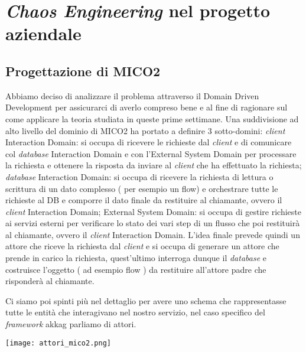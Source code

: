 
\chapter{\textit{Chaos Engineering} nel progetto aziendale}
\label{cap:analisi-requisiti}


\section{Progettazione di MICO2}

Abbiamo deciso di analizzare il problema attraverso il Domain Driven Development per assicurarci di averlo compreso bene e al fine di ragionare sul come applicare la teoria studiata in queste prime settimane. 
Una suddivisione ad alto livello del dominio di MICO2 ha portato a definire 3 sotto-domini: \textit{client} Interaction Domain: si occupa di ricevere le richieste dal \textit{client} e di comunicare col \textit{database} Interaction Domain e con l’External System Domain per processare la richiesta e ottenere la risposta da inviare al \textit{client} che ha effettuato la richiesta; 
\textit{database} Interaction Domain: si occupa di ricevere la richiesta di lettura o scrittura di un dato complesso ( per esempio un flow) e orchestrare tutte le richieste al DB e comporre il dato finale da restituire al chiamante, ovvero il \textit{client} Interaction Domain; 
External System Domain: si occupa di gestire richieste ai servizi esterni per verificare lo stato dei vari step di un flusso che poi restituirà al chiamante, ovvero il \textit{client} Interaction Domain. L'idea finale prevede quindi un attore che riceve la richiesta dal \textit{client} e si occupa di generare un attore che prende in carico la richiesta, quest'ultimo interroga dunque il \textit{database} e costruisce l'oggetto ( ad esempio flow ) da restituire all'attore padre che risponderà al chiamante.

Ci siamo poi spinti più nel dettaglio per avere uno schema che rappresentasse tutte le entità che interagivano nel nostro servizio, nel caso specifico del \textit{framework} \gls{akkag} parliamo di attori.
\begin{center}
    \texttt{[image: attori\_mico2.png]}
    \label{tab:schema-attori-mico2}
\end{center}

